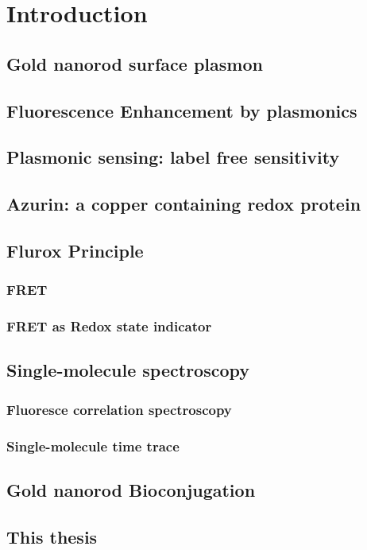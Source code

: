 \chapter{Introduction}
\section{Gold nanorod surface plasmon}
\section{Fluorescence Enhancement by plasmonics}
\section{Plasmonic sensing: label free sensitivity}
\section{Azurin: a copper containing redox protein}
\section{Flurox Principle}
\subsection{FRET}
\subsection{FRET as Redox state indicator}
\section{Single-molecule spectroscopy}
\subsection{Fluoresce correlation spectroscopy}
\subsection{Single-molecule time trace}
\section{Gold nanorod Bioconjugation}
\section{This thesis}

